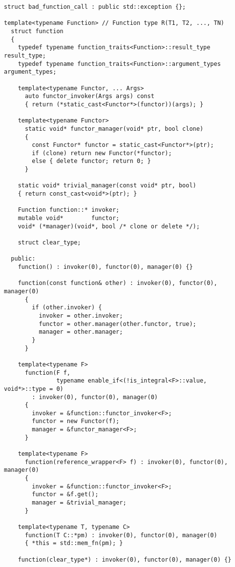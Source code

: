 \documentclass{article}
\begin{document}
\small
\begin{verbatim}
struct bad_function_call : public std::exception {};

template<typename Function> // Function type R(T1, T2, ..., TN)
  struct function
  {
    typedef typename function_traits<Function>::result_type result_type;
    typedef typename function_traits<Function>::argument_types argument_types;

    template<typename Functor, ... Args>
      auto functor_invoker(Args args) const
      { return (*static_cast<Functor*>(functor))(args); }
    
    template<typename Functor> 
      static void* functor_manager(void* ptr, bool clone)
      { 
        const Functor* functor = static_cast<Functor*>(ptr);
        if (clone) return new Functor(*functor); 
        else { delete functor; return 0; }
      }

    static void* trivial_manager(const void* ptr, bool)
    { return const_cast<void*>(ptr); }

    Function function::* invoker;
    mutable void*        functor;
    void* (*manager)(void*, bool /* clone or delete */);

    struct clear_type;

  public:
    function() : invoker(0), functor(0), manager(0) {}
    
    function(const function& other) : invoker(0), functor(0), manager(0)
      { 
        if (other.invoker) {
          invoker = other.invoker;
          functor = other.manager(other.functor, true);
          manager = other.manager;
        }
      }

    template<typename F> 
      function(F f, 
               typename enable_if<(!is_integral<F>::value, void*>::type = 0) 
        : invoker(0), functor(0), manager(0)
      {
        invoker = &function::functor_invoker<F>;
        functor = new Functor(f);
        manager = &functor_manager<F>;
      }

    template<typename F> 
      function(reference_wrapper<F> f) : invoker(0), functor(0), manager(0)
      { 
        invoker = &function::functor_invoker<F>;
        functor = &f.get();
        manager = &trivial_manager;
      }
    
    template<typename T, typename C> 
      function(T C::*pm) : invoker(0), functor(0), manager(0)
      { *this = std::mem_fn(pm); }

    function(clear_type*) : invoker(0), functor(0), manager(0) {}
    

\end{verbatim}
\end{document}
